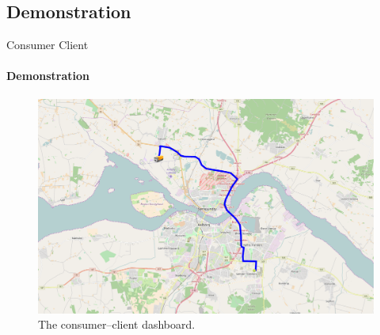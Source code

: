 \subsection{Demonstration}

\begin{frame}{Consumer Client}
    \framesubtitle{Demonstration}

    \begin{figure}[h]
        \centering
        \includegraphics[scale=0.2]{images/ConsumerClientMap.png}
        \caption{The consumer--client dashboard.}
    \end{figure}
\end{frame}

